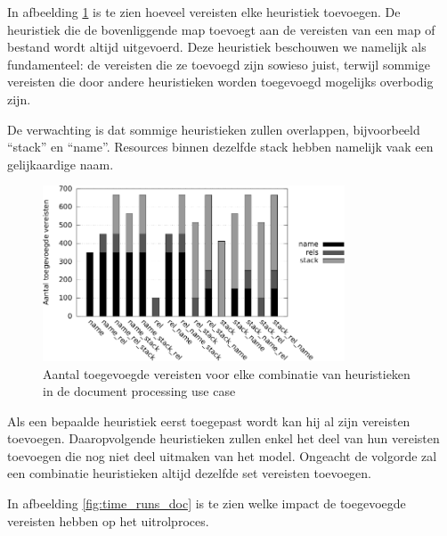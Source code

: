 In afbeelding \ref{fig:reqs_doc} is te zien hoeveel vereisten elke heuristiek toevoegen.
De heuristiek die de bovenliggende map toevoegt aan de vereisten van een map of bestand wordt altijd uitgevoerd.
Deze heuristiek beschouwen we namelijk als fundamenteel: de vereisten die ze toevoegd zijn sowieso juist, terwijl sommige vereisten die door andere heuristieken worden toegevoegd mogelijks overbodig zijn. 

De verwachting is dat sommige heuristieken zullen overlappen, bijvoorbeeld ``stack'' en ``name''. 
Resources binnen dezelfde stack hebben namelijk vaak een gelijkaardige naam. 

\begin{figure}[h]
    \begin{center}
    \includegraphics[width=0.8\textwidth]{images/reqs_doc.pdf}
    \caption{Aantal toegevoegde vereisten voor elke combinatie van heuristieken in de document processing use case}
    \label{fig:reqs_doc}
    \end{center}
\end{figure}

Als een bepaalde heuristiek eerst toegepast wordt kan hij al zijn vereisten toevoegen.
Daaropvolgende heuristieken zullen enkel het deel van hun vereisten toevoegen die nog niet deel uitmaken van het model.
Ongeacht de volgorde zal een combinatie heuristieken altijd dezelfde set vereisten toevoegen.

In afbeelding \ref{fig:time_runs_doc} is te zien welke impact de toegevoegde vereisten hebben op het uitrolproces.

